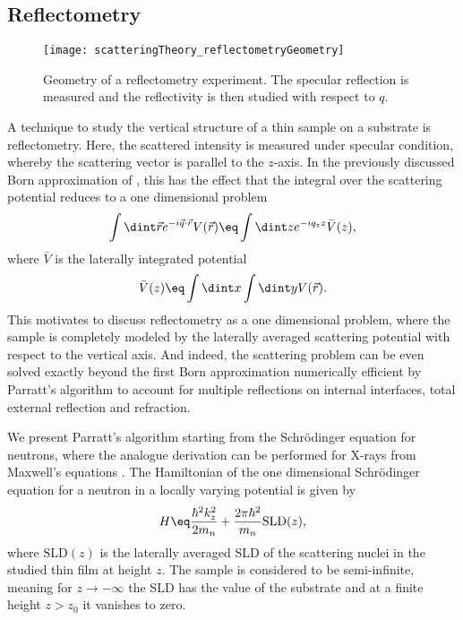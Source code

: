 \documentclass[\main/dresen_thesis.tex]{subfiles}
\begin{document}
  \subsection{Reflectometry}
    \label{sec:theoreticalBackground:scattering:reflectometry}
    \label{ch:appendix:numericalMethods:parrat}
    \begin{figure}
      \centering
      \texttt{[image: scatteringTheory\_reflectometryGeometry]}
      \caption{\label{fig:theoreticalBackground:scattering:reflectometry:geometry}Geometry of a reflectometry experiment. The specular reflection  is measured and the reflectivity is then studied with respect to $q$.}
    \end{figure}
    A technique to study the vertical structure of a thin sample on a substrate is reflectometry.
    Here, the scattered intensity is measured under specular condition, whereby the scattering vector is parallel to the $\mathit{z}$-axis.
    In the previously discussed Born approximation of , this has the effect that the integral over the scattering potential reduces to a one dimensional problem
    \begin{align}
      \int \dint \vec{r} e^{-i\vec{q} \cdot \vec{r}} V (\vec{r}) \eq \int \dint z e^{-i q_z z} \bar{V} (z),
    \end{align}
    where $\bar{V}$ is the laterally integrated potential
    \begin{align}
      \bar{V}(z) \eq \int \dint x \int \dint y V(\vec{r}).
    \end{align}
    This motivates to discuss reflectometry as a one dimensional problem, where the sample is completely modeled by the laterally averaged scattering potential with respect to the vertical axis.
    And indeed, the scattering problem can be even solved exactly beyond the first Born approximation numerically efficient by Parratt's algorithm to account for multiple reflections on internal interfaces, total external reflection and refraction.

    We present Parratt's algorithm starting from the Schr\"odinger equation for neutrons, where the analogue derivation can be performed for X-rays from Maxwell's equations \cite{Daillant_1999_Xraya}.
    The Hamiltonian of the one dimensional Schr\"odinger equation for a neutron in a locally varying potential is given by
    \begin{align}
      H \eq \frac{\hbar^2 k_z^2}{2m_n} + \frac{2 \pi \hbar^2}{m_n} \mathrm{SLD}(z),
    \end{align}
    where $\mathrm{SLD}(z)$ is the laterally averaged SLD of the scattering nuclei in the studied thin film at height $z$.
    The sample is considered to be semi-infinite, meaning for $z \rightarrow -\infty$ the SLD has the value of the substrate and at a finite height $z > z_0$ it vanishes to zero.
\end{document}
